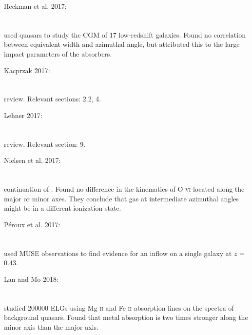 Heckman et al. 2017: \\
\citet{2017ApJ...846..151H} \\
\citep{2017ApJ...846..151H} \\
used quasars to study the CGM of 17 low-redshift galaxies. Found no correlation
between equivalent width and azimuthal angle, but attributed this to the large
impact parameters of the absorbers. \\

\hline

Kacprzak 2017: \\
\citet{2017ASSL..430..145K} \\
\citep{2017ASSL..430..145K} \\
review. Relevant sections: 2.2, 4. \\

\hline

Lehner 2017: \\
\citet{2017ASSL..430..117L} \\
\citep{2017ASSL..430..117L} \\
review. Relevant section: 9. \\

\hline

Nielsen et al. 2017: \\
\citet{2017ApJ...834..148N} \\
\citep{2017ApJ...834..148N} \\
continuation of \citet{2015ApJ...815...22K}. Found no difference in the
kinematics of O \textsc{vi} located along the major or minor axes. They conclude
that gas at intermediate azimuthal angles might be in a different ionization
state. \\

\hline

Péroux et al. 2017: \\
\citet{2017MNRAS.464.2053P} \\
\citep{2017MNRAS.464.2053P} \\
used MUSE observations to find evidence for an inflow on a single galaxy at
$z$ = 0.43. \\

\hline

Lan and Mo 2018: \\
\citet{2018ApJ...866...36L} \\
\citep{2018ApJ...866...36L} \\
studied 200000 ELGs using Mg \textsc{ii} and Fe \textsc{ii} absorption lines on
the spectra of background quasars. Found that metal absorption is two times
stronger along the minor axis than the major axis. \\

